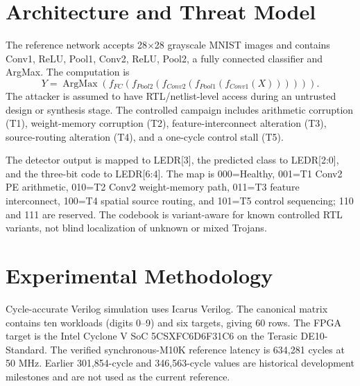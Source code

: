 \documentclass[conference]{IEEEtran}
\begin{document}
\section{Architecture and Threat Model}
The reference network accepts 28$\times$28 grayscale MNIST images and contains Conv1, ReLU, Pool1, Conv2, ReLU, Pool2, a fully connected classifier and ArgMax. The computation is
\begin{equation}
Y=\operatorname{ArgMax}(f_{FC}(f_{Pool2}(f_{Conv2}(f_{Pool1}(f_{Conv1}(X)))))).
\end{equation}
The attacker is assumed to have RTL/netlist-level access during an untrusted design or synthesis stage. The controlled campaign includes arithmetic corruption (T1), weight-memory corruption (T2), feature-interconnect alteration (T3), source-routing alteration (T4), and a one-cycle control stall (T5).

The detector output is mapped to LEDR[3], the predicted class to LEDR[2:0], and the three-bit code to LEDR[6:4]. The map is 000=Healthy, 001=T1 Conv2 PE arithmetic, 010=T2 Conv2 weight-memory path, 011=T3 feature interconnect, 100=T4 spatial source routing, and 101=T5 control sequencing; 110 and 111 are reserved. The codebook is variant-aware for known controlled RTL variants, not blind localization of unknown or mixed Trojans.

\section{Experimental Methodology}
Cycle-accurate Verilog simulation uses Icarus Verilog. The canonical matrix contains ten workloads (digits 0--9) and six targets, giving 60 rows. The FPGA target is the Intel Cyclone V SoC 5CSXFC6D6F31C6 on the Terasic DE10-Standard. The verified synchronous-M10K reference latency is 634,281 cycles at 50 MHz. Earlier 301,854-cycle and 346,563-cycle values are historical development milestones and are not used as the current reference.
\end{document}
